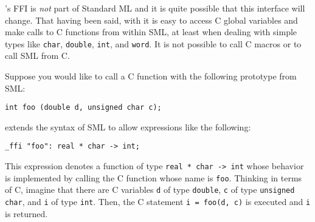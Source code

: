 
{\mlton}'s FFI is {\em not} part of Standard ML and it is quite
possible that this interface will change.  That having been said, with
{\mlton} it is easy to access C global variables and make calls to C
functions from within SML, at least when dealing with
simple types like {\tt char}, {\tt double}, {\tt int}, and {\tt word}.
It is not possible to call C macros or to call SML from C.

Suppose you would like to call a C function with the following prototype
from SML:
\begin{verbatim}
int foo (double d, unsigned char c);
\end{verbatim}
{\mlton} extends the syntax of SML to allow expressions like the following:
\begin{verbatim}
_ffi "foo": real * char -> int;
\end{verbatim}
This expression denotes a function of type {\tt real * char -> int}
whose behavior is implemented by calling the C function whose name is
{\tt foo}.  Thinking in terms of C, imagine that there are C
variables {\tt d} of type {\tt double}, {\tt c} of type {\tt unsigned
char}, and {\tt i} of type {\tt int}.  Then, the C statement
\mbox{\tt i = foo(d, c)} is executed and {\tt i} is returned.

